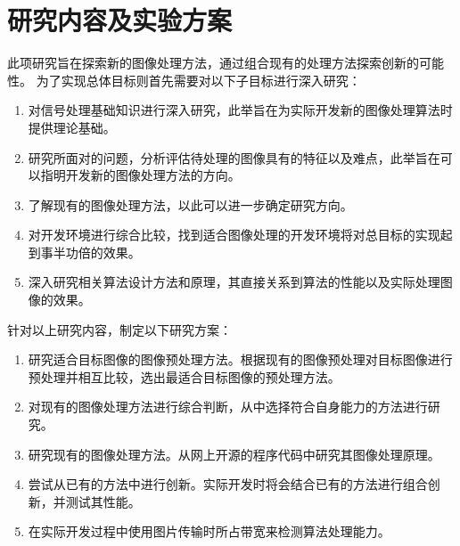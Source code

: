 %
%
%
%

\section{研究内容及实验方案}

此项研究旨在探索新的图像处理方法，通过组合现有的处理方法探索创新的可能性。
为了实现总体目标则首先需要对以下子目标进行深入研究：
\begin{enumerate}[label=\arabic*)]
    \item 对信号处理基础知识进行深入研究，此举旨在为实际开发新的图像处理算法时提供理论基础。
    \item 研究所面对的问题，分析评估待处理的图像具有的特征以及难点，此举旨在可以指明开发新的图像处理方法的方向。
    \item 了解现有的图像处理方法，以此可以进一步确定研究方向。
    \item 对开发环境进行综合比较，找到适合图像处理的开发环境将对总目标的实现起到事半功倍的效果。
    \item 深入研究相关算法设计方法和原理，其直接关系到算法的性能以及实际处理图像的效果。
\end{enumerate}



针对以上研究内容，制定以下研究方案：
\begin{enumerate}[label=\arabic*)]
    \item 研究适合目标图像的图像预处理方法。根据现有的图像预处理对目标图像进行预处理并相互比较，选出最适合目标图像的预处理方法。
    \item 对现有的图像处理方法进行综合判断，从中选择符合自身能力的方法进行研究。
    \item 研究现有的图像处理方法。从网上开源的程序代码中研究其图像处理原理。
    \item 尝试从已有的方法中进行创新。实际开发时将会结合已有的方法进行组合创新，并测试其性能。
    \item 在实际开发过程中使用图片传输时所占带宽来检测算法处理能力。
\end{enumerate}

